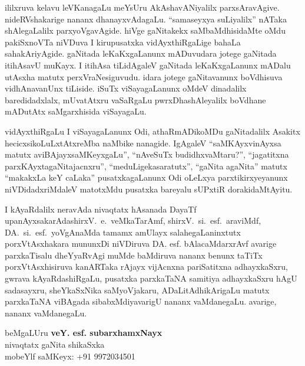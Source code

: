 ililxruva kelavu leVKanagaLu meYsUru AkAshavANiyalilx parxsAravAgive. nideRV\-shakarige nananx dhanayxvAdagaLu. ``samaseyxya suLiyalilx'' nATaka shAlegaLalilx parxyoVga\-vAgide. hiVge gaNitakekx saMbaMdhisidaMte oMdu 
pakiSxnoVTa niVDuva I kirupusatxka vidAyxthiR\-gaLige bahaLa sahakAriyAgide. gaNitada leKaKxgaLanunx mADuvudara jotege gaNitada itihAsavU muKayx. I itihAsa tiLidAgaleV gaNitada leKaKxgaLanunx mADalu utAsxha matutx perxVraNesiguvudu. idara jotege gaNitavanunx boVdhisuva vidhAnavanUnx tiLiside. iSuTx viSayagaLanunx oMdeV dinadalilx baredidadxlalx, mUvatAtxru vaSaRgaLu pwrxDhashAle\-yalilx boVdhane mADutAtx saMgarxhisida viSayagaLu.

vidAyxthiRgaLu I viSayagaLanunx Odi, athaRmADikoMDu gaNitadalilx Asakitx\- hecicxsikoLuLxtAtxreMba naMbike nanagide. IgAgaleV ``saMKAyxvinAyxsa matutx aviBAjayx\break saMKeyxgaLu'',  ``nAveSuTx budidhxvaMtaru?'', ``jagatitxna parxKAyxtagaNitajacnxru'', ``meduLige\break kasaratutx'', ``gaNita agaNita'' matutx ``makakxLa keY caLaka'' pusatxkagaLanunx Odi oLeLxya parxtikirxye\-yanunx niVDi\-dadxriMdaleV matotxMdu pusatxka bareyalu sUPxtiR dorakidaMtAyitu.

I kAyaRdalilx neravAda nivaqtatx hAsanada DayaTf upanAyxsakarAda\break shirxV.~e.~veMkaTarAmf, shirxV.~si.~esf.~araviMdf, 
DA.~si.~esf.~yoVgAnaMda tamamx amUlayx salahegaLaninxtutx porxVtAsxhakara mununxDi niVDiruva DA. esf. bAlacaMdarxrAvf avarige parxkaTisalu dheYyaRvAgi muMde baMdiruva nananx benunx taTiTx porxVtAsxhisiruva kanARTaka rAjayx vijAcnxna pariSatitxna adhayxkaSxru, gwrava kAyaRdashiRgaLu, pusatxka parxkaTaNA samitiya adhayxkaSxru hAgU sadasayxru, sheYkaSxNika saMyoVjakaru, ADaLitAdhikArigaLu matutx parxkaTaNA viBAgada sibabxMdiyavarigU nananx vaMdanegaLu. avarige, nananx vaMdane\-gaLu.

\begin{flushright}
beMgaLUru \hfill{\bf veY. esf. subarxhamxNayx}\hfill\\
nivaqtatx gaNita shikaSxka\\
mobeYlf saMKeyx: {\rm +91 9972034501}
\end{flushright}






\newpage

